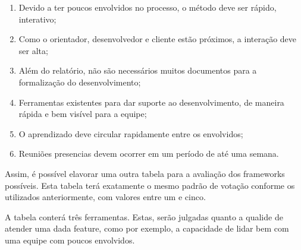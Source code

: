 \begin{enumerate}
    \item Devido a ter poucos envolvidos no processo, o método deve ser rápido, interativo;
    \item Como o orientador, desenvolvedor e cliente estão próximos, a interação deve ser alta;
    \item Além do relatório, não são necessários muitos documentos para a formalização do desenvolvimento;
    \item Ferramentas existentes para dar suporte ao desenvolvimento, de maneira rápida e bem visível para a equipe;
    \item O aprendizado deve circular rapidamente entre os envolvidos;
    \item Reuniões presencias devem ocorrer em um período de até uma semana.
\end{enumerate}

Assim, é possível elavorar uma outra tabela para a avaliação dos frameworks possíveis. Esta tabela terá exatamente
o mesmo padrão de votação conforme os utilizados anteriormente, com valores entre um e cinco.

A tabela conterá três ferramentas. Estas, serão julgadas quanto a qualide de atender uma dada feature, como por exemplo,
a capacidade de lidar bem com uma equipe com poucos envolvidos.

